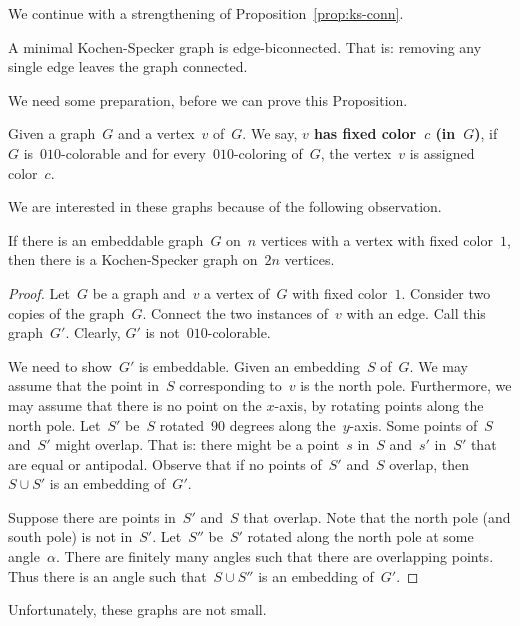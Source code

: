 \documentclass{report}
\newcommand{\keyword}[1]{\textbf{#1}}
\begin{document}
We continue with a strengthening of Proposition~\ref{prop:ks-conn}.
\begin{proposition}\label{prop:ks-biconn}
A minimal Kochen-Specker graph is edge-biconnected.
That is: removing any single edge leaves the graph connected.
\end{proposition}
We need some preparation, before we can prove this Proposition.
\begin{definition}
Given a graph~$G$ and a vertex~$v$ of~$G$.
We say, \keyword{$v$ has fixed color~$c$ (in~$G$)},
if~$G$ is~$010$-colorable
and for every~$010$-coloring of~$G$,
the vertex~$v$ is assigned color~$c$.
\end{definition}
We are interested in these graphs because of the following observation.
\begin{lemma}\label{lem:biconn}
If there is an embeddable graph~$G$ on~$n$ vertices with a vertex
with fixed color~$1$,
then there is a Kochen-Specker graph on~$2n$ vertices.
\end{lemma}
\begin{proof}
Let~$G$ be a graph and~$v$ a vertex of~$G$ with fixed color~$1$.
Consider two copies of the graph~$G$.
Connect the two instances of~$v$ with an edge.
Call this graph~$G'$.
Clearly, $G'$ is not~$010$-colorable.

We need to show~$G'$ is embeddable.
Given an embedding~$S$ of~$G$.
We may assume that the point in~$S$ corresponding to~$v$
is the north pole.
Furthermore, we may assume that there is no point on the $x$-axis,
by rotating points along the north pole.
Let~$S'$ be~$S$ rotated~$90$ degrees along the~$y$-axis.
Some points of~$S$ and~$S'$ might overlap.
That is: there might be a point~$s$ in~$S$ and~$s'$ in~$S'$
that are equal or antipodal.
Observe that if no points of~$S'$ and~$S$ overlap,
then~$S \cup S'$ is an embedding of~$G'$.

Suppose there are points in~$S'$ and~$S$
that overlap.
Note that the north pole (and south pole) is not in~$S'$. 
Let~$S''$ be~$S'$ rotated along the north pole at some angle~$\alpha$.
There are finitely many angles such that there are overlapping points.
Thus there is an angle such that~$S \cup S''$ is an embedding of~$G'$.
\end{proof}
Unfortunately, these graphs are not small.
\end{document}
